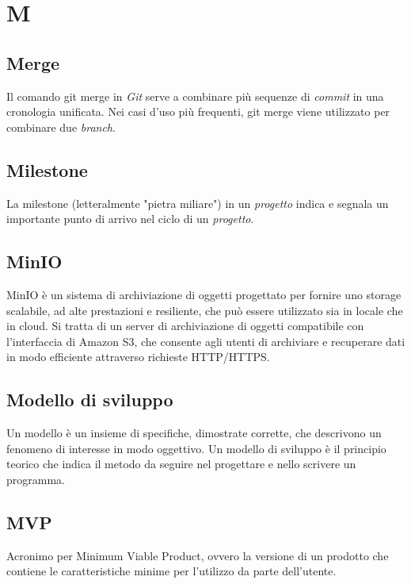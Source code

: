 \chapter{M}

\section{Merge}
Il comando git merge in \emph{Git} serve a combinare più sequenze di \emph{commit} in una cronologia unificata. Nei casi d’uso più frequenti, git merge viene utilizzato per combinare due \emph{branch}.

\section{Milestone}
La milestone (letteralmente "pietra miliare") in un \emph{progetto} indica e segnala un importante punto di arrivo nel ciclo di un \emph{progetto}.

\section{MinIO}
MinIO è un sistema di archiviazione di oggetti  progettato per fornire uno storage scalabile, ad alte prestazioni e resiliente, che può essere utilizzato sia in locale che in cloud. Si tratta di un server di archiviazione di oggetti compatibile con l'interfaccia  di Amazon S3, che consente agli utenti di archiviare e recuperare dati in modo efficiente attraverso richieste HTTP/HTTPS.

\section{Modello di sviluppo}\label{sec:Modelli di sviluppo}
Un modello è un insieme di specifiche, dimostrate corrette, che descrivono un fenomeno di interesse in modo oggettivo. Un modello di sviluppo è il principio teorico che indica il metodo da seguire nel progettare e nello scrivere un programma.

\section{MVP}\label{sec:Minimum Viable Product}
Acronimo per Minimum Viable Product, ovvero la versione di un prodotto che contiene le caratteristiche minime per l'utilizzo da parte dell'utente.
